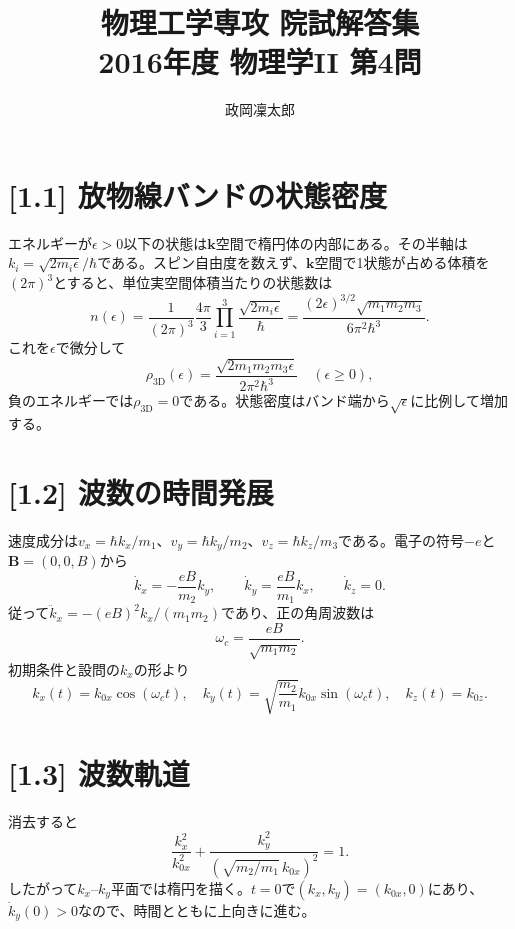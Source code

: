 \documentclass[11pt,a4paper]{article}
\title{物理工学専攻 院試解答集\\2016年度 物理学II 第4問}
\author{政岡凜太郎}
\date{}
\begin{document}
\maketitle

\section*{[1.1] 放物線バンドの状態密度}
エネルギーが$\epsilon>0$以下の状態は$\boldsymbol k$空間で楕円体の内部にある。その半軸は$k_i=\sqrt{2m_i\epsilon}/\hbar$である。スピン自由度を数えず、$\boldsymbol k$空間で1状態が占める体積を$(2\pi)^3$とすると、単位実空間体積当たりの状態数は
\begin{equation}
  n(\epsilon)=\frac{1}{(2\pi)^3}\frac{4\pi}{3}
  \prod_{i=1}^{3}\frac{\sqrt{2m_i\epsilon}}{\hbar}
  =\frac{(2\epsilon)^{3/2}\sqrt{m_1m_2m_3}}{6\pi^2\hbar^3}.
\end{equation}
これを$\epsilon$で微分して
\begin{equation}
  \boxed{\rho_{3\mathrm D}(\epsilon)=
  \frac{\sqrt{2m_1m_2m_3\epsilon}}{2\pi^2\hbar^3}\quad(\epsilon\ge0),}
\end{equation}
負のエネルギーでは$\rho_{3\mathrm D}=0$である。状態密度はバンド端から$\sqrt\epsilon$に比例して増加する。

\section*{[1.2] 波数の時間発展}
速度成分は$v_x=\hbar k_x/m_1$、$v_y=\hbar k_y/m_2$、$v_z=\hbar k_z/m_3$である。電子の符号$-e$と$\boldsymbol B=(0,0,B)$から
\begin{equation}
  \dot k_x=-\frac{eB}{m_2}k_y,\qquad
  \dot k_y=\frac{eB}{m_1}k_x,\qquad
  \dot k_z=0.
\end{equation}
従って$\ddot k_x=-(eB)^2k_x/(m_1m_2)$であり、正の角周波数は
\begin{equation}
  \boxed{\omega_c=\frac{eB}{\sqrt{m_1m_2}}}.
\end{equation}
初期条件と設問の$k_x$の形より
\begin{equation}
  \boxed{k_x(t)=k_{0x}\cos(\omega_ct),\quad
  k_y(t)=\sqrt{\frac{m_2}{m_1}}k_{0x}\sin(\omega_ct),\quad
  k_z(t)=k_{0z}.}
\end{equation}

\section*{[1.3] 波数軌道}
消去すると
\begin{equation}
  \frac{k_x^2}{k_{0x}^2}+
  \frac{k_y^2}{(\sqrt{m_2/m_1}\,k_{0x})^2}=1.
\end{equation}
したがって$k_x$–$k_y$平面では楕円を描く。$t=0$で$(k_x,k_y)=(k_{0x},0)$にあり、$\dot k_y(0)>0$なので、時間とともに上向きに進む。
\end{document}

